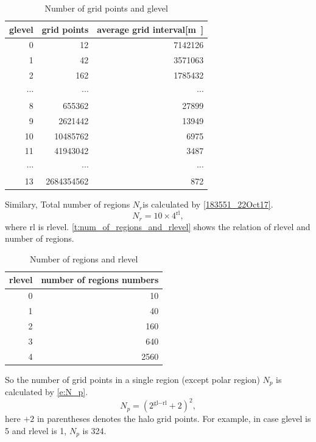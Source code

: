 \begin{table}[htb]
\centering
\caption{Number of grid points and glevel}
\label{t:num_of_grid_points_and_glevel}
\small
\begin{tabular}{|r|r|r|}
\hline
glevel& grid points & average grid interval[\si{\meter]}\\
\hline
 0&  \num{12}&         \num{7142126}\\
\hline
 1&  \num{42}&         \num{3571063} \\
\hline
 2&  \num{162}&        \num{1785432} \\
\hline
 $\cdots$ & $\cdots$& $\cdots$\\
\hline
 8&  \num{655362}&     \num{27899}\\
\hline
 9&  \num{2621442}&    \num{13949}\\
\hline
 10& \num{10485762}&   \num{6975}\\
\hline
 11& \num{41943042}&   \num{3487}\\
\hline
$\cdots$ & $\cdots$& $\cdots$\\
\hline
 13& \num{2684354562}& \num{872}\\
\hline
\end{tabular}
\end{table}


Similary, Total number of regions $N_r$is calculated by \autoref{183551_22Oct17}.
%
\begin{equation}
 N_r = 10 \times 4^\text{rl}, \label{183551_22Oct17}
\end{equation}
%
where $\text{rl}$ is rlevel.
%
\autoref{t:num_of_regions_and_rlevel} shows the relation of rlevel and number of regions.

\begin{table}[htb]
\centering
\caption{Number of regions and rlevel}
\label{t:num_of_regions_and_rlevel}
\small
\begin{tabular}{|r|r|}
\hline
rlevel& number of regions numbers\\
\hline
 0& 10 \\
\hline
 1& 40 \\
\hline
 2& 160 \\
\hline
 3& 640 \\
\hline
 4& 2560 \\
\hline
\end{tabular}
\end{table}

So the number of grid points in a single region (except polar region) $N_p$ is calculated by
\autoref{e:N_p}.
%
\begin{equation}
 N_p = (2 ^ {\text{gl} - \text{rl}} + 2 )^2, \label{e:N_p}
\end{equation}
%
here $+2$ in parentheses denotes the halo grid points.
%
For example, in case glevel is 5 and rlevel is 1, $N_p$ is 324.
%
